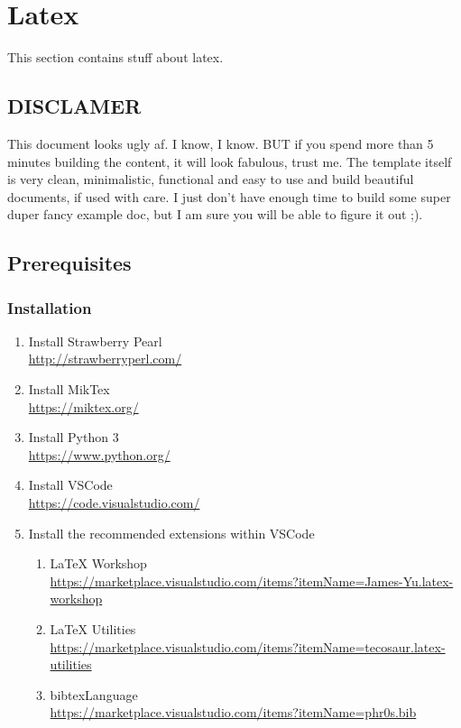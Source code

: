 \section{Latex}
\label{chap:Latex}

This section contains stuff about \gls{latex}.

\subsection{DISCLAMER}
This document looks ugly af. I know, I know. BUT if you spend more than 5 minutes building the content, it will look fabulous, trust me. The template itself is very clean, minimalistic, functional and easy to use and build beautiful documents, if used with care. I just don't have enough time to build some super duper fancy example doc, but I am sure you will be able to figure it out ;).

\subsection{Prerequisites}

\subsubsection{Installation}

\begin{enumerate}
  \item Install Strawberry Pearl\\\url{http://strawberryperl.com/}
  \item Install MikTex\\\url{https://miktex.org/}
  \item Install Python 3\\\url{https://www.python.org/}
  \item Install VSCode\\\url{https://code.visualstudio.com/}
  \item Install the recommended extensions within VSCode
        \begin{enumerate}
          \item LaTeX Workshop\\\url{https://marketplace.visualstudio.com/items?itemName=James-Yu.latex-workshop}
          \item LaTeX Utilities\\\url{https://marketplace.visualstudio.com/items?itemName=tecosaur.latex-utilities}
          \item bibtexLanguage\\\url{https://marketplace.visualstudio.com/items?itemName=phr0s.bib}
        \end{enumerate}
\end{enumerate}

